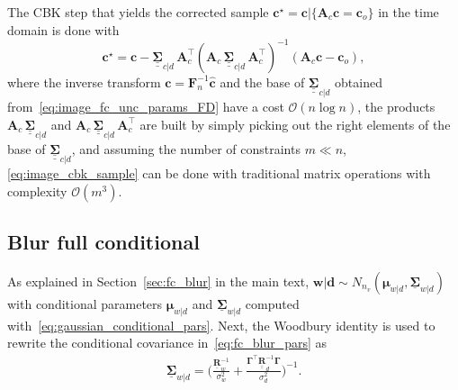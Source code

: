 \documentclass[12pt]{article}
\newcommand{\mycirc}[1] {\underline{\bm{#1}}}
\newcommand{\mybcirc}[1] {\underline{\underline{\bm{#1}}}}
\begin{document}
The CBK step that yields the corrected sample $\bm{c}^{\star} = \bm{c} | \{ \bm{A}_c \bm{c} = \bm{c}_o\}$ in the time domain is done with
\begin{equation} \label{eq:image_cbk_sample}
    \bm{c}^{\star} = \bm{c} -  \mybcirc{\Sigma}_{c|d} \,\bm{A}_c^{\top} (\bm{A}_c \, \mybcirc{\Sigma}_{c|d} \, \bm{A}_c^{\top})^{-1} (\bm{A}_c \bm{c} - \bm{c}_{o}),
\end{equation}
where the inverse transform $\bm{c} = \bm{F}_n^{-1}\widehat{\bm{c}}$ and the base of $\mybcirc{\Sigma}_{c|d}$ obtained from~\eqref{eq:image_fc_unc_params_FD} have a cost $\mathcal{O}(n \log n)$, the products  $\bm{A}_c \, \mybcirc{\Sigma}_{c|d}$ and $\bm{A}_c \, \mybcirc{\Sigma}_{c|d} \, \bm{A}_c^{\top}$ are built by simply picking out the right elements of the base of $\mybcirc{\Sigma}_{c|d}$, and assuming the number of constraints $m\ll n$, \eqref{eq:image_cbk_sample} can be done with traditional matrix operations with complexity $\mathcal{O}(m^3)$. 

\subsection{Blur full conditional} \label{ap:fc_blur}
As explained in Section~\ref{sec:fc_blur} in the main text, 
$\bm{w}|\bm{d} \sim N_{n_v}(\bm{\mu}_{w|d}, \mycirc{\Sigma}_{w|d})$
with conditional parameters $\bm{\mu}_{w|d}$ and $\mycirc{\Sigma}_{w|d}$
computed with~\eqref{eq:gaussian_conditional_pars}. 
Next, the Woodbury identity is used to rewrite the conditional covariance in~\eqref{eq:fc_blur_pars} as
\begin{align}\label{eq:fc_blur_cov_woodbury}
    \mycirc{\Sigma}_{w|d}= \bigl(\frac{\mycirc{R}_w^{-1}}{\sigma_w^2}+\frac{\bm{\Gamma}^{\top}\mybcirc{R}_d^{-1}\bm{\Gamma}}{\sigma_d^2} \bigr)^{-1}.
\end{align}
\end{document}
